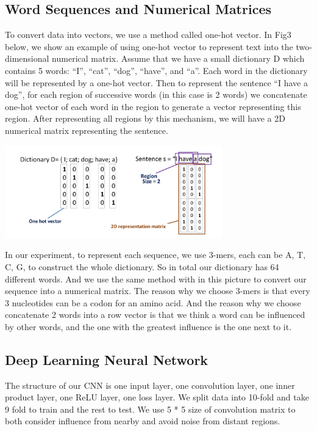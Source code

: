 \documentclass[letterpaper, 11pt]{article}
\newenvironment{Figure}
  {\par\medskip\noindent\minipage{\linewidth}}
  {\endminipage\par\medskip}
\begin{document}
\begin{multicols*}{2}
{\subsection{Word Sequences and Numerical Matrices}
To convert data into vectors, we use a method called one-hot vector. In Fig3 below, we show an example of using one-hot vector to represent text into the two-dimensional numerical matrix. Assume that we have a small dictionary D which contains 5 words: “I”, “cat”, “dog”, “have”, and “a”. Each word in the dictionary will be represented by a one-hot vector. Then to represent the sentence “I have a dog”, for each region of successive words (in this case is 2 words) we concatenate one-hot vector of each word in the region to generate a vector representing this region. After representing all regions by this mechanism, we will have a 2D numerical matrix representing the sentence.
~\cite{DNA-sequence-classification}
\begin{Figure}
\includegraphics[height = 4cm, width = \textwidth]{word2vec.png}
\end{Figure}

In our experiment, to represent each sequence, we use 3-mers, each can be A, T, C, G, to construct the whole dictionary. So in total our dictionary has 64 different words. And we use the same method with in this picture to convert our sequence into a numerical matrix. The reason why we choose 3-mers is that every 3 nucleotides can be a codon for an amino acid. And the reason why we 	choose concatenate 2 words into a row vector is that we think a word can be influenced by other words, and the one with the greatest influence is the one next to it.

\subsection{Deep Learning Neural Network}
The structure of our CNN is one input layer, one convolution layer, one inner product layer, one ReLU layer, one loss layer. We split data into 10-fold and take 9 fold to train and the rest to test. We use 5 * 5 size of convolution matrix to both consider influence from nearby and avoid noise from distant regions. 
}


\end{multicols*}
\end{document}
